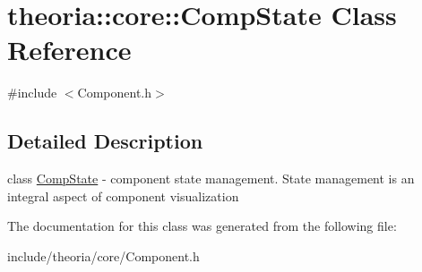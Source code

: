 \hypertarget{classtheoria_1_1core_1_1CompState}{\section{theoria\+:\+:core\+:\+:Comp\+State Class Reference}
\label{classtheoria_1_1core_1_1CompState}
}


{\ttfamily \#include $<$Component.\+h$>$}



\subsection{Detailed Description}
class \hyperlink{classtheoria_1_1core_1_1CompState}{Comp\+State} -\/ component state management. State management is an integral aspect of component visualization 

The documentation for this class was generated from the following file\+:\begin{DoxyCompactItemize}
\item 
include/theoria/core/Component.\+h\end{DoxyCompactItemize}
